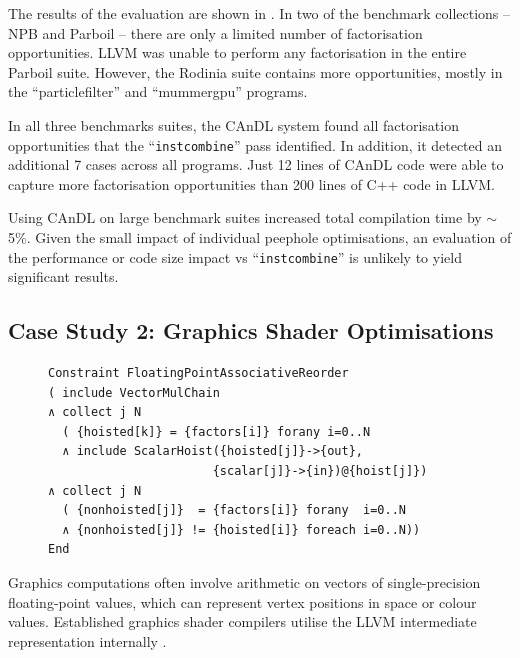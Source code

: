     The results of the evaluation are shown in
    .
    In two of the benchmark collections -- NPB and Parboil -- there are
    only a limited number of factorisation opportunities.
    LLVM was unable to perform any factorisation in the entire Parboil suite.
    However, the Rodinia suite contains more opportunities, mostly in the
    ``particlefilter'' and ``mummergpu'' programs.

    In all three benchmarks suites, the CAnDL system found all factorisation
    opportunities that the ``{\tt instcombine}'' pass identified.
    In addition, it detected an additional 7 cases across all programs.
    Just 12 lines of CAnDL code were able to capture more factorisation
    opportunities than 200 lines of C++ code in LLVM.

    Using CAnDL on large benchmark suites increased total compilation time
    by $\sim$5\%.
    Given the small impact of individual peephole optimisations, an
    evaluation of the performance or code size impact vs ``{\tt instcombine}''
    is unlikely to yield significant results.

\subsection{Case Study 2: Graphics Shader Optimisations}

\begin{figure}[t]
\vspace{3.6mm}
\begin{lstlisting}[language=CAnDL,label={fig:Lewis},caption=
   {CAnDL defines multiplication chains with genuine vectors and hoisted
    scalars:
    After separating the two cases, some of the multiplications can be performed
    on scalars instead.}]
Constraint FloatingPointAssociativeReorder
( include VectorMulChain
∧ collect j N
  ( {hoisted[k]} = {factors[i]} forany i=0..N
  ∧ include ScalarHoist({hoisted[j]}->{out},
                       {scalar[j]}->{in})@{hoist[j]})
∧ collect j N
  ( {nonhoisted[j]}  = {factors[i]} forany  i=0..N
  ∧ {nonhoisted[j]} != {hoisted[i]} foreach i=0..N))
End
\end{lstlisting}
\end{figure}

    Graphics computations often involve arithmetic on vectors of
    single-precision floating-point values, which can represent vertex positions
    in space or colour values.
    Established graphics shader compilers utilise the LLVM intermediate
    representation internally \citep{cudacompiler}.

